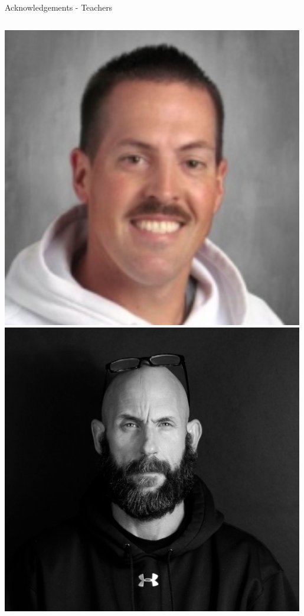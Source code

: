 \documentclass[aspectratio=169]{beamer}
\begin{document}
\begin{frame}{Acknowledgements - Teachers}
    \begin{columns}

            \centering
            \includegraphics[width=0.99\textwidth]{people/teachers/waldron.png}
            \includegraphics[width=0.99\textwidth]{people/people/shap2.png}

\end{columns}
\end{frame}
\end{document}
